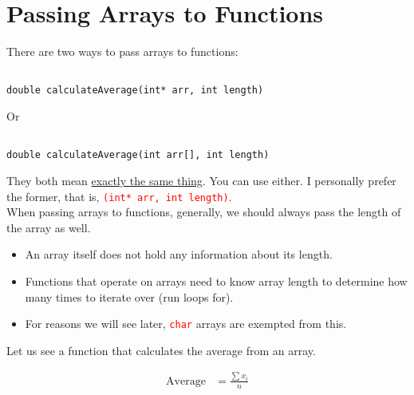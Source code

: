 \documentclass[12pt]{article}
\begin{document}
\newpage
{}
\section*{Passing Arrays to Functions}

\noindent There are two ways to pass arrays to functions:

\begin{verbatim}

double calculateAverage(int* arr, int length)

\end{verbatim}

\begin{center}
    Or
\end{center}

\begin{verbatim}

double calculateAverage(int arr[], int length)

\end{verbatim}

\vspace{1cm}

\noindent They both mean \href{https://stackoverflow.com/questions/6567742/passing-an-array-as-an-argument-to-a-function-in-c}{exactly the same thing}. You can use either. I personally prefer the former, that is, \textcolor{red}{\texttt{(int* arr, int length)}}. \\

\noindent When passing arrays to functions, generally, we should always pass the length of the array as well.

\begin{itemize}
    \item An array itself does not hold any information about its length. 
    \item Functions that operate on arrays need to know array length to determine how many times to iterate over (run loops for).
    \item For reasons we will see later, \textcolor{red}{\texttt{char}} arrays are exempted from this.
\end{itemize}

\newpage
\noindent Let us see a function that calculates the average from an array.  

\begin{align*}
    \text{Average} &= \frac{\sum x_i}{n} \\
\end{align*}
\end{document}
